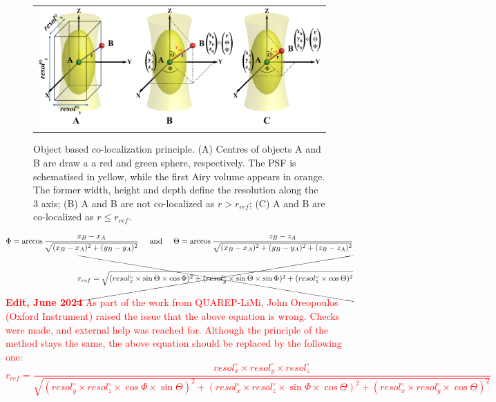 \documentclass[]{spie}  %
\begin{document}
\begin{figure}[!ht]
\begin{center}
\begin{tabular}{c}
\includegraphics[width=0.75\linewidth]{figs/objFig.png}
\end{tabular}
\end{center}
\caption[obj] 
{\label{fig:obj}
Object based co-localization principle. (A) Centres of objects A and B are draw a a red and green sphere, respectively. The PSF is schematised in yellow, while the first Airy volume appears in orange. The former width, height and depth define the resolution along the 3 axis; (B) A and B are not co-localized as $r>r_{ref}$; (C) A and B are co-localized as $r\le r_{ref}$.}
\end{figure}
\begin{eqnarray}
\Phi=\arccos\frac{x_{B}-x_{A}}{\sqrt{(x_{B}-x_{A})^2+(y_{B}-y_{A})^2}} \hspace{0.5cm} \mbox{and} \hspace{0.5cm} \Theta=\arccos\frac{z_{B}-z_{A}}{\sqrt{(x_{B}-x_{A})^2+(y_{B}-y_{A})^2+(z_{B}-z_{A})^2}}\label{phiTheta}\\
 \xcancel{r_{ref}=\sqrt{(resol^\circ_{x}\times\sin\Theta\times\cos\Phi )^2+(resol^\circ_{y}\times\sin\Theta\times\sin\Phi)^2+(resol^\circ_{z}\times\cos\Theta)^2\label{refDist}}}
\label{eqn:objBased}
\end{eqnarray}

\textbf{\textcolor{red}{Edit, June 2024}}
\textcolor{red}{As part of the work from QUAREP-LiMi, John Oreopoulos (Oxford Instrument) raised the issue that the above equation is wrong. Checks were made, and external help was reached for. Although the principle of the method stays the same, the above equation should be replaced by the following one:
\begin{equation}
    r_{ref}=\frac{resol^\circ_{x}\times resol^\circ_{y}\times resol^\circ_{z}}{\sqrt{(resol^\circ_{y} \times resol^\circ_{z} \times\cos\Phi\times\sin\Theta)^2+(resol^\circ_{x}\times resol^\circ_{z} \times\sin\Phi\times\cos\Theta)^2+(resol^\circ_{x}\times resol^\circ_{y} \times\cos\Theta)^2}}
\end{equation}
}
\end{document}
